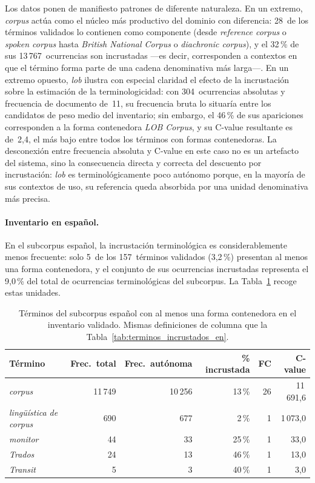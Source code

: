 Los datos ponen de manifiesto patrones de diferente naturaleza. En un extremo, \textit{corpus} actúa como el núcleo más productivo del dominio con diferencia: 28~de los términos validados lo contienen como componente (desde \textit{reference corpus} o \textit{spoken corpus} hasta \textit{British National Corpus} o \textit{diachronic corpus}), y el 32\,\% de sus 13\,767~ocurrencias son incrustadas ---es decir, corresponden a contextos en que el término forma parte de una cadena denominativa más larga---. En un extremo opuesto, \textit{lob} ilustra con especial claridad el efecto de la incrustación sobre la estimación de la terminologicidad: con 304~ocurrencias absolutas y frecuencia de documento de~11, su frecuencia bruta lo situaría entre los candidatos de peso medio del inventario; sin embargo, el 46\,\% de sus apariciones corresponden a la forma contenedora \textit{LOB Corpus}, y su C-value resultante es de~2{,}4, el más bajo entre todos los términos con formas contenedoras. La desconexión entre frecuencia absoluta y C-value en este caso no es un artefacto del sistema, sino la consecuencia directa y correcta del descuento por incrustación: \textit{lob} es terminológicamente poco autónomo porque, en la mayoría de sus contextos de uso, su referencia queda absorbida por una unidad denominativa más precisa.

\paragraph{Inventario en español.}
En el subcorpus español, la incrustación terminológica es considerablemente menos frecuente: solo 5~de los 157~términos validados (3,2\,\%) presentan al menos una forma contenedora, y el conjunto de sus ocurrencias incrustadas representa el 9,0\,\% del total de ocurrencias terminológicas del subcorpus. La Tabla~\ref{tab:terminos_incrustados_es} recoge estas unidades.

\begin{table}[H]
\centering
\small
\setlength{\tabcolsep}{4pt}
\renewcommand{\arraystretch}{1.15}
\caption{Términos del subcorpus español con al menos una forma contenedora en el inventario validado. Mismas definiciones de columna que la Tabla~\ref{tab:terminos_incrustados_en}.}
\label{tab:terminos_incrustados_es}
\begin{tabular}{@{} l r r r r r @{}}
\toprule
\textbf{Término} & \textbf{Frec.\ total} & \textbf{Frec.\ autónoma} & \textbf{\% incrustada} & \textbf{FC} & \textbf{C-value} \\
\midrule
\textit{corpus}               & 11\,749 & 10\,256 & 13\,\% & 26 & 11\,691{,}6 \\
\textit{lingüística de corpus}&    690  &    677  &  2\,\% &  1 &  1\,073{,}0 \\
\textit{monitor}              &     44  &     33  & 25\,\% &  1 &     33{,}0 \\
\textit{Trados}               &     24  &     13  & 46\,\% &  1 &     13{,}0 \\
\textit{Transit}              &      5  &      3  & 40\,\% &  1 &      3{,}0 \\
\bottomrule
\end{tabular}
\end{table}

